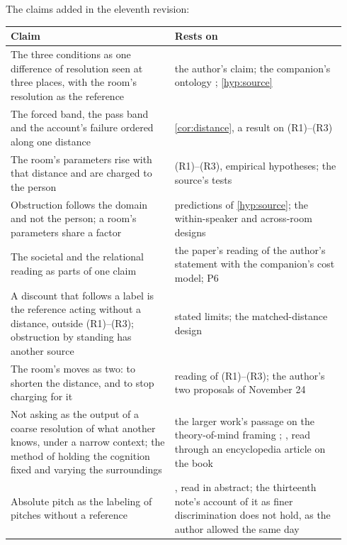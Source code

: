\noindent The claims added in the eleventh revision:
\begin{center}\small
\begin{tabular}{p{0.46\linewidth} p{0.48\linewidth}}
\toprule
Claim & Rests on \\
\midrule
The three conditions as one difference of resolution seen at three places, with the room's resolution as the reference & the author's claim; the companion's ontology \cite{NormCost}; \autoref{hyp:source} \\
The forced band, the pass band and the account's failure ordered along one distance & \autoref{cor:distance}, a result on (R1)--(R3) \\
The room's parameters rise with that distance and are charged to the person & (R1)--(R3), empirical hypotheses; the source's tests \\
Obstruction follows the domain and not the person; a room's parameters share a factor & predictions of \autoref{hyp:source}; the within-speaker and across-room designs \\
The societal and the relational reading as parts of one claim & the paper's reading of the author's statement with the companion's cost model; P6 \\
A discount that follows a label is the reference acting without a distance, outside (R1)--(R3); obstruction by standing has another source & stated limits; the matched-distance design \\
The room's moves as two: to shorten the distance, and to stop charging for it & reading of (R1)--(R3); the author's two proposals of November 24 \\
Not asking as the output of a coarse resolution of what another knows, under a narrow context; the method of holding the cognition fixed and varying the surroundings & the larger work's passage on the theory-of-mind framing \cite{Aethus}; \cite{PremackPremack1983}, read through an encyclopedia article on the book \\
Absolute pitch as the labeling of pitches without a reference & \cite{LevitinRogers2005}, read in abstract; the thirteenth note's account of it as finer discrimination does not hold, as the author allowed the same day \\
\bottomrule
\end{tabular}
\end{center}

